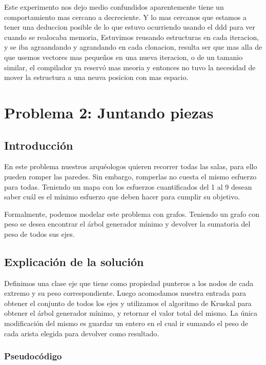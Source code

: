 \documentclass[spanish,12pt]{article}
\begin{document}
Este experimento nos dejo medio confundidos aparentemente tiene un comportamiento mas cercano a decreciente. Y lo mas cercanos que estamos a tener una deduccion posible de lo que estuvo ocurriendo  usando el ddd para ver cuando se realocaba memoria,
Estuvimos reusando estructuras en cada iteracion, y se iba agraandando y agrandando en cada clonacion,  resulta ser que mas alla de que usemos vectores mas pequeños en una nueva iteracion, o de un tamanio similar, el compilador ya reservó mas meoria y entonces no tuvo la necesidad de mover la estructura a una neuva posicion con mas espacio.
 
\section{Problema 2: Juntando piezas }

\subsection{Introducción}

En este problema nuestros arquéologos quieren recorrer todas las salas, para ello pueden romper las paredes. Sin embargo, romperlas no cuesta el mismo esfuerzo para todas. Teniendo un mapa con los esfuerzos cuantificados del 1 al 9 desean saber cuál es el mínimo esfuerzo que deben hacer para cumplir su objetivo.

Formalmente, podemos modelar este problema con grafos. Teniendo un grafo con peso se desea encontrar el árbol generador mínimo y devolver la sumatoria del peso de todos sus ejes.

\subsection{Explicación de la solución}

Definimos una clase eje que tiene como propiedad punteros a los nodos de cada extremo y su peso correspondiente.
Luego acomodamos nuestra entrada para obtener el conjunto de todos los ejes y utilizamos el algoritmo de Kruskal para obtener el árbol generador mínimo, y retornar el valor total del mismo. La única modificación del mismo es guardar un entero en el cual ir sumando el peso de cada arista elegida para devolver como resultado.



\subsubsection{Pseudocódigo}
\end{document}
